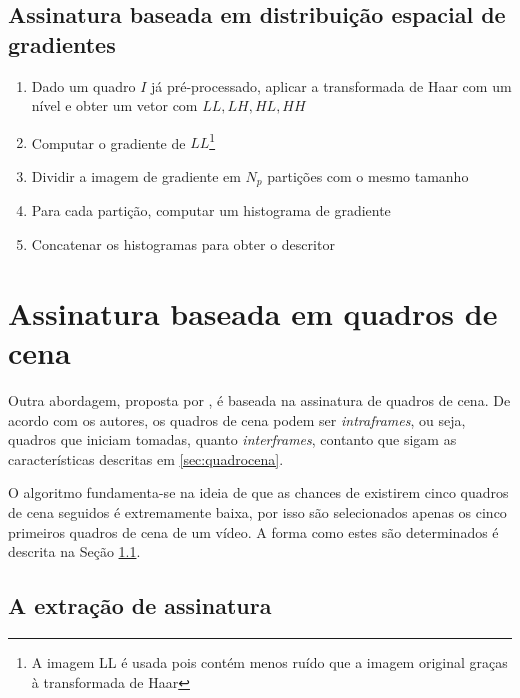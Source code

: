 \subsection{Assinatura baseada em distribuição espacial de gradientes}

\begin{enumerate}
\item Dado um quadro $I$ já pré-processado, aplicar a transformada de Haar com um nível e obter um vetor com $LL,LH,HL,HH$
\item Computar o gradiente de $LL$\footnote{A imagem LL é usada pois contém menos ruído que a imagem original graças à transformada de Haar}
\item Dividir a imagem de gradiente em $N_p$ partições com o mesmo tamanho
\item Para cada partição, computar um histograma de gradiente
\item Concatenar os histogramas  para obter o descritor
\end{enumerate}

%
%

\section{Assinatura baseada em quadros de cena}

  Outra abordagem, proposta por \citeauthor{mao2015sceneframe}, é baseada na assinatura de quadros de cena. De acordo com os autores, os quadros de cena podem ser \textit{intraframes}, ou seja, quadros que iniciam tomadas, quanto \textit{interframes}, contanto que sigam as características descritas em \ref{sec:quadrocena}.
    
    O algoritmo fundamenta-se na ideia de que as chances de existirem cinco quadros de cena seguidos é extremamente baixa, por isso são selecionados apenas os cinco primeiros quadros de cena de um vídeo. A forma como estes são determinados é descrita na Seção \ref{subsec:fptsceneframe}.

\subsection{A extração de assinatura}
\label{subsec:fptsceneframe}

% 

